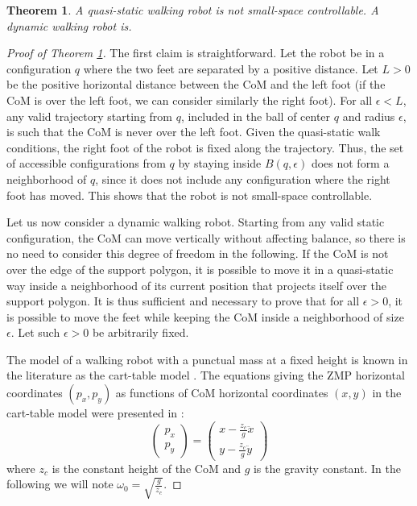 \documentclass{article}
\newtheorem{theorem}{Theorem}
\begin{document}
\begin{theorem}
\label{thm:humanoid-ssc}
A quasi-static walking robot is not small-space controllable. A dynamic walking robot is.
\end{theorem}

\begin{proof}[Proof of Theorem \ref{thm:humanoid-ssc}]

The first claim is straightforward. Let the robot be in a configuration $q$ where the two
feet are separated by a positive distance. Let  $L>0$ be the positive horizontal distance
between the CoM and the left foot (if the CoM is over the left foot, we can consider similarly 
the right foot). For all $\epsilon < L$, any valid trajectory starting from $q$, included in
the ball of center $q$ and radius $\epsilon$, is such that the CoM is never over the left foot.
Given the quasi-static walk conditions, the right foot of the robot is fixed along 
the trajectory. Thus, the set of accessible configurations from $q$ by staying inside 
$B(q,\epsilon)$ does not form a neighborhood of $q$, since it does not include any configuration
where the right foot has moved. This shows that the robot is not small-space controllable.

\bigskip

Let us now consider a dynamic walking robot. Starting from any valid static configuration, 
the CoM can move vertically without affecting balance, so there is no need to 
consider this degree of freedom in the following. If the CoM is not over the edge of the support
polygon, it is possible to move it in a quasi-static way inside a neighborhood of its current position that projects itself over the support polygon.
It is thus sufficient and necessary to prove that for all $\epsilon >0$, it is possible to move
the feet while keeping the CoM inside a neighborhood of size $\epsilon$. Let such $\epsilon >0$
be arbitrarily fixed.


The model of a walking robot with a punctual
mass at a fixed height is known in the literature as the cart-table model \cite{kajita2003biped}.
The equations  giving  the   ZMP  horizontal  coordinates  $(p_x,p_y)$  as
functions  of CoM  horizontal coordinates $(x,y)$  in the  cart-table  model were
presented in \cite{kajita2003biped}:
\begin{equation}
\label{eq:walk-zmp}
\left(
\begin{array}{c}
p_x\\ p_y
\end{array}
\right) = \displaystyle \left(
\begin{array}{c}
x - \frac{z_c}{g} \ddot{x}\\ y - \frac{z_c}{g} \ddot{y}
\end{array}
\right)
\end{equation}
where $z_c$ is  the constant height of the CoM and  $g$ is the gravity
constant.    In    the    following    we    will    note    $\omega_0
=\sqrt{\frac{g}{z_c}}$.


\end{proof}
\end{document}
